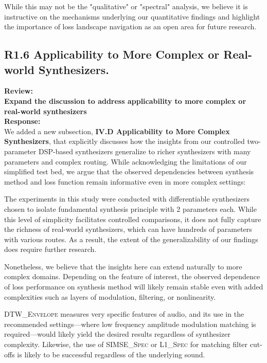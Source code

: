 \documentclass[11pt]{article}
\newcommand{\DTWEnv}{\textsc{DTW\_Envelope}}
\newcommand{\SIMSESpec}{\textsc{SIMSE\_Spec}}
\newcommand{\LoneSpec}{\textsc{L1\_Spec}}
\begin{document}
While this may not be the "qualitative" or "spectral" analysis, we believe it is instructive on the mechanisms underlying our quantitative findings and highlight the importance of loss landscape navigation as an open area for future research.

\subsection*{R1.6 Applicability to More Complex or Real-world Synthesizers.}
\label{R1.6}
\noindent\textbf{Review:} \\
\noindent \textbf{Expand the discussion to address applicability to more complex or real-world synthesizers}
\\

\noindent\textbf{Response:} \\
We added a new subsection, \textbf{IV.D Applicability to More Complex Synthesizers}, that explicitly discusses how the insights from our controlled two-parameter DSP-based synthesizers generalize to richer synthesizers with many parameters and complex routing. While acknowledging the limitations of our simplified test bed, we argue that the observed dependencies between synthesis method and loss function remain informative even in more complex settings:

\begin{displayquote}
    The experiments in this study were conducted with differentiable synthesizers chosen to isolate fundamental synthesis principle with 2 parameters each. While this level of simplicity facilitates controlled comparisons, it does not fully capture the richness of real-world synthesizers, which can have hundreds of parameters with various routes. As a result, the extent of the generalizability of our findings does require further research. 

    Nonetheless, we believe that the insights here can extend naturally to more complex domains. Depending on the feature of interest, the observed dependence of loss performance on synthesis method will likely remain stable even with added complexities such as layers of modulation, filtering, or nonlinearity. 
    
    \DTWEnv{} measures very specific features of audio, and its use in the recommended settings---where low frequency amplitude modulation matching is required---would likely yield the desired results regardless of synthesizer complexity. Likewise, the use of \SIMSESpec{} or \LoneSpec{} for matching filter cut-offs is likely to be successful regardless of the underlying sound. 
    \end{displayquote}
    
\end{document}
